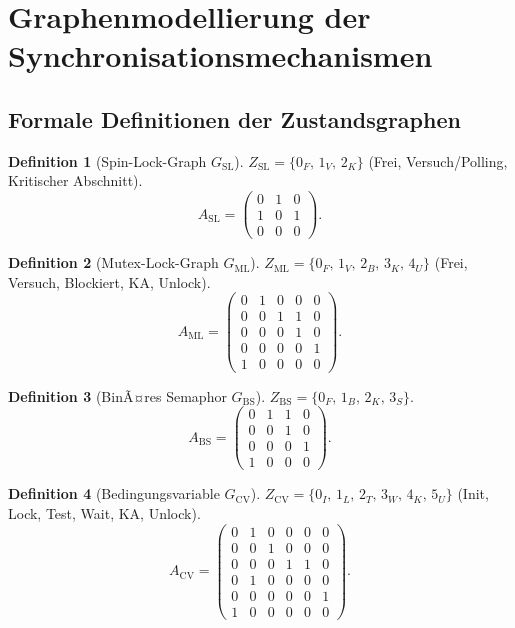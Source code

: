﻿\documentclass[a4paper,12pt]{article}
\theoremstyle{definition}
\newtheorem{definition}{Definition}
\begin{document}
\section{Graphenmodellierung der Syn\-chro\-ni\-sa\-tions\-me\-cha\-nis\-men}
\label{sec:modellierung}

\subsection{Formale Definitionen der Zustandsgraphen}

\begin{definition}[Spin-Lock-Graph $G_{\mathrm{SL}}$]
$Z_{\mathrm{SL}} = \{0_F,\, 1_V,\, 2_K\}$
(Frei, Versuch/Polling, Kritischer Abschnitt).
\[
  A_{\mathrm{SL}} =
  \begin{pmatrix} 0 & 1 & 0 \\ 1 & 0 & 1 \\ 0 & 0 & 0 \end{pmatrix}.
\]
\end{definition}

\begin{definition}[Mutex-Lock-Graph $G_{\mathrm{ML}}$]
$Z_{\mathrm{ML}} = \{0_F,\, 1_V,\, 2_B,\, 3_K,\, 4_U\}$
(Frei, Versuch, Blockiert, KA, Unlock).
\[
  A_{\mathrm{ML}} =
  \begin{pmatrix}
    0&1&0&0&0\\0&0&1&1&0\\0&0&0&1&0\\0&0&0&0&1\\1&0&0&0&0
  \end{pmatrix}.
\]
\end{definition}

\begin{definition}[BinÃ¤res Semaphor $G_{\mathrm{BS}}$]
$Z_{\mathrm{BS}} = \{0_F,\, 1_B,\, 2_K,\, 3_S\}$.
\[
  A_{\mathrm{BS}} =
  \begin{pmatrix}
    0&1&1&0\\0&0&1&0\\0&0&0&1\\1&0&0&0
  \end{pmatrix}.
\]
\end{definition}

\begin{definition}[Bedingungsvariable $G_{\mathrm{CV}}$]
$Z_{\mathrm{CV}} = \{0_I,\,1_L,\,2_T,\,3_W,\,4_K,\,5_U\}$
(Init, Lock, Test, Wait, KA, Unlock).
\[
  A_{\mathrm{CV}} =
  \begin{pmatrix}
    0&1&0&0&0&0\\0&0&1&0&0&0\\0&0&0&1&1&0\\
    0&1&0&0&0&0\\0&0&0&0&0&1\\1&0&0&0&0&0
  \end{pmatrix}.
\]
\end{definition}
\end{document}
